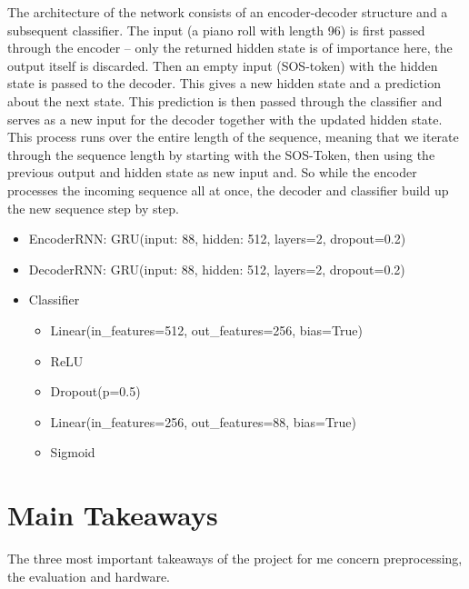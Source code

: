 \documentclass[a4paper, 10pt, xcolor=dvipsnames]{article} %
\begin{document}
The architecture of the network consists of an encoder-decoder structure and a
subsequent classifier. The input (a piano roll with length 96) is first passed
through the encoder -- only the returned hidden state is of importance here,
the output itself is discarded. Then an empty input (SOS-token) with the hidden
state is passed to the decoder. This gives a new hidden state and a prediction
about the next state. This prediction is then passed through the classifier and
serves as a new input for the decoder together with the updated hidden state.
This process runs over the entire length of the sequence, meaning that we
iterate through the sequence length by starting with the SOS-Token, then using
the previous output and hidden state as new input and. So while the encoder
processes the incoming sequence all at once, the decoder and classifier build
up the new sequence step by step.

\begin{itemize}
  \item EncoderRNN: GRU(input: 88, hidden: 512, layers=2, dropout=0.2)
  \item DecoderRNN: GRU(input: 88, hidden: 512, layers=2, dropout=0.2)
  \item Classifier
        \begin{itemize}
          \item  Linear(in\_features=512, out\_features=256, bias=True)
          \item  ReLU
          \item  Dropout(p=0.5)
          \item  Linear(in\_features=256, out\_features=88, bias=True)
          \item  Sigmoid
        \end{itemize}
\end{itemize}

\section{Main Takeaways}

The three most important takeaways of the project for me concern preprocessing,
the evaluation and hardware.
\end{document}
